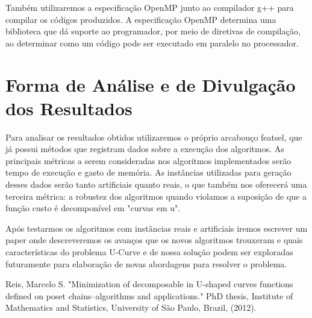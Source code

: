 \documentclass[12pt]{article}
\begin{document}
Também utilizaremos a especificação OpenMP junto ao compilador g++ para
compilar os códigos produzidos. A especificação OpenMP determina uma 
biblioteca que dá suporte ao programador, por meio de diretivas de 
compilação, ao determinar como um código pode ser executado em 
paralelo no processador.

\section{Forma de Análise e de Divulgação dos Resultados}
Para analisar os resultados obtidos utilizaremos o próprio arcabouço
featsel, que já possui métodos que registram dados sobre a execução dos
algoritmos. As principais métricas a serem consideradas nos algoritmos
implementados serão tempo de execução e gasto de memória. As instâncias
utilizadas para geração desses dados serão tanto artificiais quanto 
reais, o que também nos oferecerá uma terceira métrica: a robustez dos
algoritmos quando violamos a suposição de que a função custo é 
decomponível em "curvas em u".

Após testarmos os algoritmos com instâncias reais e artificiais iremos
escrever um paper onde descreveremos os avanços que os novos algoritmos
trouxeram e quais características do problema U-Curve e de nossa solução
podem ser exploradas futuramente para elaboração de novas abordagens 
para resolver o problema.


\newpage
\begin{thebibliography}{}
    Reis, Marcelo S. "Minimization of decomposable in U-shaped curves 
    functions defined on poset chains–algorithms and applications."
    PhD thesis, Institute of Mathematics and Statistics, University of
    São Paulo, Brazil, (2012).


\end{thebibliography}
\end{document}
